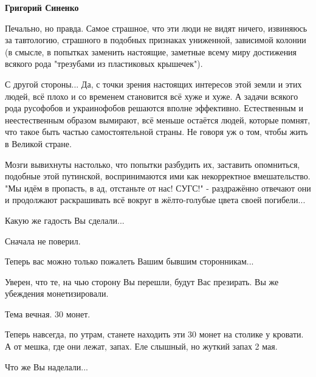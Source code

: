\begin{itemize}
\begin{itemize}
 
\textbf{Григорий Синенко} 

Печально, но правда. Самое страшное, что эти люди не видят ничего, извиняюсь за
тавтологию, страшного в подобных признаках униженной, зависимой колонии (в
смысле, в попытках заменить настоящие, заметные всему миру достижения всякого
рода "трезубами из пластиковых крышечек").

С другой стороны... Да, с точки зрения настоящих интересов этой земли и этих
людей, всё плохо и со временем становится всё хуже и хуже. А задачи всякого
рода русофобов и украинофобов решаются вполне эффективно. Естественным и
неестественным образом вымирают, всё меньше остаётся людей, которые помнят, что
такое быть частью самостоятельной страны. Не говоря уж о том, чтобы жить в
Великой стране.

Мозги вывихнуты настолько, что попытки разбудить их, заставить опомниться,
подобные этой путинской, воспринимаются ими как некорректное вмешательство. "Мы
идём в пропасть, в ад, отстаньте от нас! СУГС!" - раздражённо отвечают они и
продолжают раскрашивать всё вокруг в жёлто-голубые цвета своей погибели...

\end{itemize}

 

Какую же гадость Вы сделали...

Сначала не поверил.

Теперь вас можно только пожалеть Вашим бывшим сторонникам...

Уверен, что те, на чью сторону Вы перешли, будут Вас презирать. Вы же убеждения
монетизировали.

Тема вечная. 30 монет.

Теперь навсегда, по утрам, станете находить эти 30 монет на столике у кровати.
А от мешка, где они лежат, запах. Еле слышный, но жуткий запах 2 мая.

Что же Вы наделали...

\begin{itemize}
 

\end{itemize}
\end{itemize}

